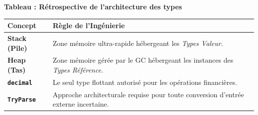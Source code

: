 \begin{center}
    \textbf{Tableau : Rétrospective de l'architecture des types} \\[0.3cm]
    \begin{tabular}{@{}lp{10cm}@{}}
        \toprule
        \textbf{Concept} & \textbf{Règle de l'Ingénierie} \\
        \midrule
        \textbf{Stack (Pile)} & Zone mémoire ultra-rapide hébergeant les \emph{Types Valeur}. \\
        \textbf{Heap (Tas)} & Zone mémoire gérée par le GC hébergeant les instances des \emph{Types Référence}. \\
        \textbf{\texttt{decimal}} & Le seul type flottant autorisé pour les opérations financières. \\
        \textbf{\texttt{TryParse}} & Approche architecturale requise pour toute conversion d'entrée externe incertaine. \\
        \bottomrule
    \end{tabular}
\end{center}

